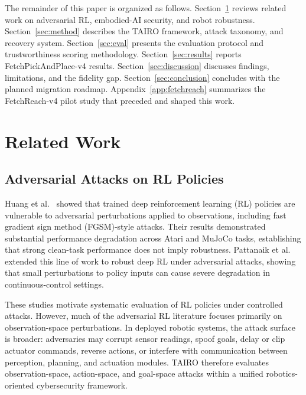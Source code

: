 \documentclass[conference]{IEEEtran}
\begin{document}
The remainder of this paper is organized as follows. Section~\ref{sec:related} reviews
related work on adversarial RL, embodied-AI security, and robot robustness. Section~\ref{sec:method}
describes the TAIRO framework, attack taxonomy, and recovery system. Section~\ref{sec:eval}
presents the evaluation protocol and trustworthiness scoring methodology. Section~\ref{sec:results}
reports FetchPickAndPlace-v4 results. Section~\ref{sec:discussion} discusses
findings, limitations, and the fidelity gap. Section~\ref{sec:conclusion} concludes
with the planned migration roadmap. Appendix~\ref{app:fetchreach} summarizes the
FetchReach-v4 pilot study that preceded and shaped this work.

\section{Related Work}
\label{sec:related}

\subsection{Adversarial Attacks on RL Policies}

Huang et al.~\cite{huang2017adversarial} showed that trained deep reinforcement
learning (RL) policies are vulnerable to adversarial perturbations applied to
observations, including fast gradient sign method (FGSM)-style attacks. Their results
demonstrated substantial performance degradation across Atari and MuJoCo tasks,
establishing that strong clean-task performance does not imply robustness. Pattanaik
et al.~\cite{pattanaik2018robust} extended this line of work to robust deep RL under
adversarial attacks, showing that small perturbations to policy inputs can cause severe
degradation in continuous-control settings.

These studies motivate systematic evaluation of RL policies under controlled attacks.
However, much of the adversarial RL literature focuses primarily on observation-space
perturbations. In deployed robotic systems, the attack surface is broader: adversaries
may corrupt sensor readings, spoof goals, delay or clip actuator commands, reverse
actions, or interfere with communication between perception, planning, and actuation
modules. TAIRO therefore evaluates observation-space, action-space, and goal-space
attacks within a unified robotics-oriented cybersecurity framework.
\end{document}
